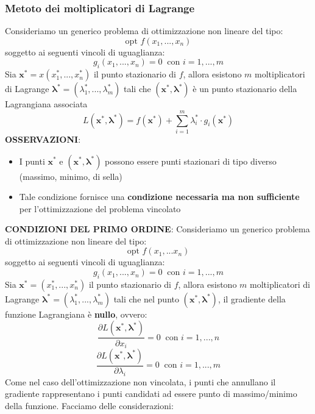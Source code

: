 \documentclass[12pt]{article}
\begin{document}
\subsubsection{Metoto dei moltiplicatori di Lagrange}
Consideriamo un generico problema di ottimizzazione non lineare del tipo:
$$\textrm{opt } f(x_1,...,x_n)$$
soggetto ai seguenti vincoli di uguaglianza:
$$g_i(x_1,...,x_n) = 0 \; \; \textrm{con } i = 1,...,m$$
Sia $\boldsymbol{x^*} = x(x_1^*,...,x_n^*)$ il punto stazionario di $f$, allora esistono $m$ moltiplicatori di Lagrange $\boldsymbol{\lambda^*} = (\lambda_1^*,...,\lambda_m^*)$ tali che
$(\boldsymbol{x}^*, \boldsymbol{\lambda}^*)$ è un punto stazionario della Lagrangiana associata
$$L(\boldsymbol{x}^*, \boldsymbol{\lambda}^*) = f(\boldsymbol{x}^*) + \sum_{i=1}^{m} \lambda_i^* \cdot g_i(\boldsymbol{x}^*)$$
\textbf{OSSERVAZIONI}:
\begin{itemize}
    \item I punti $\boldsymbol{x}^*$ e  $(\boldsymbol{x}^*, \boldsymbol{\lambda}^*)$ possono essere punti stazionari di tipo diverso (massimo, minimo, di sella)
    \item Tale condizione fornisce una \textbf{condizione necessaria ma non sufficiente} per l'ottimizzazione del problema vincolato
\end{itemize}
\textbf{CONDIZIONI DEL PRIMO ORDINE}: \newline
Consideriamo un generico problema di ottimizzazione non lineare del tipo:
$$\textrm{opt } f(x_1,...x_n)$$
soggetto ai seguenti vincoli di uguaglianza:
$$g_i(x_1,...,x_n) = 0 \; \; \textrm{con } i = 1,...,m$$
Sia $\boldsymbol{x}^* = (x_1^*,...,x_n^*)$ il punto stazionario di $f$, allora esistono $m$ moltiplicatori di Lagrange $\boldsymbol{\lambda^*} = (\lambda_1^*, ...,\lambda_m^*)$ tali che nel punto
$(\boldsymbol{x}^*, \boldsymbol{\lambda}^*)$, il gradiente della funzione Lagrangiana è \textbf{nullo}, ovvero:
$$\frac{\partial L(\boldsymbol{x}^*, \boldsymbol{\lambda}^*)}{\partial x_i} = 0 \; \; \textrm{con } i = 1,...,n$$
$$\frac{\partial L(\boldsymbol{x}^*, \boldsymbol{\lambda}^*)}{\partial \lambda_i} = 0 \; \; \textrm{con } i = 1,...,m$$
Come nel caso dell'ottimizzazione non vincolata, i punti che annullano il gradiente rappresentano i punti candidati ad essere punto di massimo/minimo della funzione.
Facciamo delle considerazioni:
\end{document}

